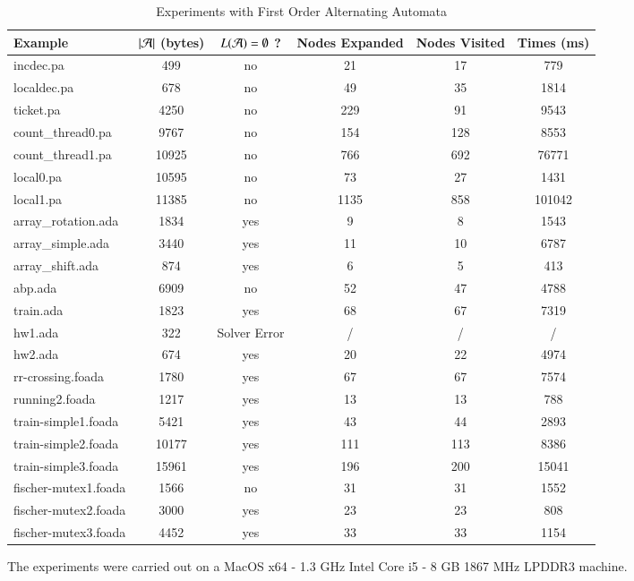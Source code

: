 \begin{table}[htb]
\vspace*{-\baselineskip}
\begin{center}
{\fontsize{7}{8}\selectfont
\begin{tabular}{||l|c|c|c|c|c||}
\hline
Example & ${|{\mathcal{A}}|}$ (bytes) & $L(\mathcal{A})=\emptyset$ ? & Nodes Expanded & Nodes Visited & Times (ms) \\
\hline
incdec.pa & 499 & no & 21 & 17 & 779 \\
\hline
localdec.pa & 678 & no & 49 & 35 & 1814 \\
\hline
ticket.pa & 4250 & no & 229 & 91 & 9543 \\
\hline
count\_thread0.pa & 9767 & no & 154 & 128 & 8553 \\
\hline
count\_thread1.pa & 10925 & no & 766 & 692 & 76771 \\
\hline
local0.pa & 10595 & no & 73 & 27 & 1431 \\
\hline
local1.pa & 11385 & no & 1135 & 858 & 101042 \\
\hline
array\_rotation.ada & 1834 & yes & 9 & 8 & 1543 \\
\hline
array\_simple.ada & 3440 & yes & 11 & 10 & 6787 \\
\hline
array\_shift.ada & 874 & yes & 6 & 5 & 413 \\
\hline
abp.ada & 6909 & no & 52 & 47 & 4788 \\
\hline
train.ada & 1823 & yes & 68 & 67 & 7319 \\
\hline
hw1.ada & 322 & Solver Error & / & / & / \\
\hline
hw2.ada & 674 & yes & 20 & 22 & 4974 \\
\hline
rr-crossing.foada & 1780 & yes & 67 & 67 & 7574 \\
\hline
running2.foada & 1217 & yes & 13 & 13 & 788 \\
\hline
train-simple1.foada & 5421 & yes & 43 & 44 & 2893 \\
\hline
train-simple2.foada & 10177 & yes & 111 & 113 & 8386 \\
\hline
train-simple3.foada & 15961 & yes & 196 & 200 & 15041 \\
\hline
fischer-mutex1.foada & 1566 & no & 31 & 31 & 1552 \\
\hline
fischer-mutex2.foada & 3000 & yes & 23 & 23 & 808 \\
\hline
fischer-mutex3.foada & 4452 & yes & 33 & 33 & 1154 \\
\hline
\end{tabular}
}
\caption{Experiments with First Order Alternating Automata}
\label{tab:experiments}
\end{center}
\vspace*{-2\baselineskip}
\end{table}

The experiments were carried out on a MacOS x64 - 1.3 GHz
  Intel Core i5 - 8 GB 1867 MHz LPDDR3 machine. 
